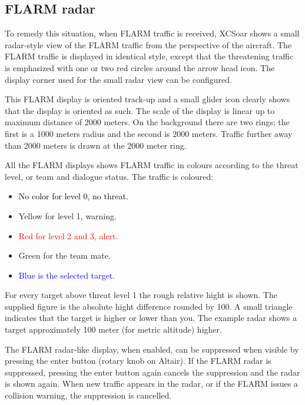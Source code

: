 \subsection*{FLARM radar}

To remedy this situation, when FLARM traffic is received, XCSoar shows a 
small radar-style view of the FLARM
traffic from the perspective of the aircraft.  The FLARM traffic is
displayed in identical style, except that the threatening traffic is emphasized 
with one or two red circles around the arrow head icon.  The display corner used 
for the small radar view can be configured.

This FLARM display is oriented track-up and a small glider icon
clearly shows that the display is oriented as such.  The scale of the
display is linear up to maximum distance of 2000 meters.  On the
background there are two rings; the first is a 1000 meters radius and the second 
is 2000 meters.  Traffic further away than 2000 meters is drawn at the 2000 meter ring.

All the FLARM displays shows FLARM traffic in colours according to
the threat level, or team and dialogue status.  The traffic is coloured:
\begin{itemize}
\item \textcolor{black} {No color for level 0, no threat.} 
\item \textcolor{warning} { Yellow for level 1, warning.}
\item \textcolor{red} {Red for level 2 and 3, alert.}
\item \textcolor{teammate} {Green for the team mate.}
\item \textcolor{blue} {Blue is the selected target.}
\end{itemize}

For every target above threat level 1 the rough relative hight is shown. The
supplied figure is the absolute hight difference rounded by 100.  A small
triangle indicates that the target is higher or lower than you.  The example
radar shows a target approximately 100 meter (for metric altitude) higher.

The FLARM radar-like display, when enabled, can be suppressed when
visible by pressing the enter button (rotary knob on Altair).  If the
FLARM radar is suppressed, pressing the enter button again cancels the
suppression and the radar is shown again.  When new traffic appears in
the radar, or if the FLARM issues a collision warning, the suppression
is cancelled.

